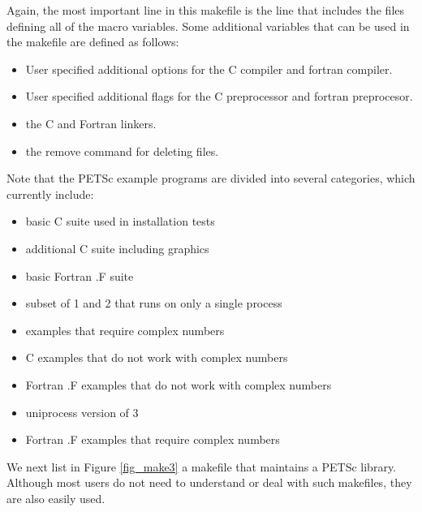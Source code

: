 {{{Again, the most important line in this makefile is the 
line that includes the files defining all of the macro variables.
Some additional variables that can be used in the makefile are defined
as follows:
\begin{itemize}
\item {} User specified additional options for the C compiler and
        fortran compiler.
\item {} User specified additional flags for the C preprocessor
        and fortran preprocesor.
\item {} the C and Fortran linkers. 
\item {} the remove command for deleting files.
\end{itemize}
Note that the PETSc example programs are divided into several
categories, which currently include: 
\begin{itemize}
\item {} basic C suite used in installation tests\\
\item {} additional C suite including graphics\\
\item {} basic Fortran .F suite\\
\item {} subset of 1 and 2 that runs on only a single process\\
\item {} examples that require complex numbers\\
\item {} C examples that do not work with complex numbers\\
\item {} Fortran .F examples that do not work with complex numbers\\
\item {} uniprocess version of 3\\
\item {} Fortran .F examples that require complex numbers\\
\end{itemize}

We next list in Figure \ref{fig_make3} a makefile that maintains a PETSc 
library.  Although most users do not need to understand or deal with such
makefiles, they are also easily used.

}}}

